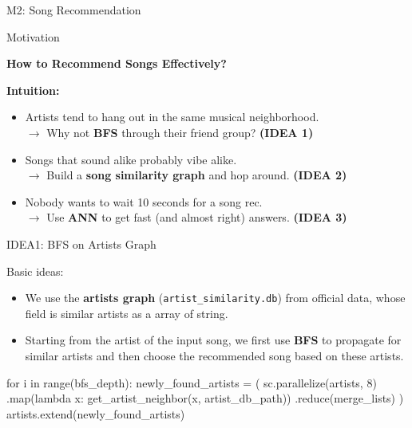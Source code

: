 \documentclass{beamer}
\begin{document}
\begin{section}{M2: Song Recommendation}
    \begin{frame}{Motivation}

    \begin{center}
        \textbf{How to Recommend Songs Effectively?}
    \end{center}
    \textbf{Intuition:}
    \begin{itemize}
        \item Artists tend to hang out in the same musical neighborhood. \\
              $\longrightarrow$ Why not \textbf{BFS} through their friend group? \hfill \textbf{(IDEA 1)}

        \item Songs that sound alike probably vibe alike. \\
              $\longrightarrow$ Build a \textbf{song similarity graph} and hop around. \hfill \textbf{(IDEA 2)}

        \item Nobody wants to wait 10 seconds for a song rec. \\
              $\longrightarrow$ Use \textbf{ANN} to get fast (and almost right) answers. \hfill \textbf{(IDEA 3)}
    \end{itemize}
    
    \end{frame}
    
    \begin{frame}[fragile]{IDEA1: BFS on Artists Graph}

    Basic ideas:

    \begin{itemize}
        \item We use the \textbf{artists graph} (\texttt{artist\_similarity.db}) from official data, whose field is similar artists as a array of string.
        \item Starting from the artist of the input song, we first use \textbf{BFS} to propagate for similar artists and then choose the recommended song based on these artists.
    \end{itemize}

    \begin{mycodepython}
for i in range(bfs_depth):
    newly_found_artists = (
        sc.parallelize(artists, 8)
        .map(lambda x: get_artist_neighbor(x, artist_db_path))
        .reduce(merge_lists)
    )
    artists.extend(newly_found_artists)
    \end{mycodepython}
        

\end{frame}
\end{section}
\end{document}
